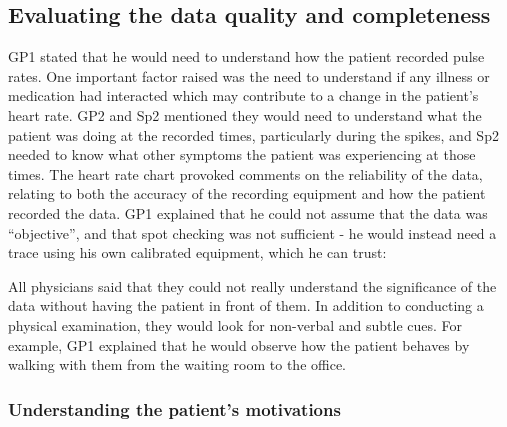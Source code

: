 \documentclass{sigchi}
\begin{document}

\subsection{Evaluating the data quality and completeness}

GP1 stated that he would need to understand how the patient recorded pulse rates. One important factor raised was the need to understand if any illness or medication had interacted which may contribute to a change in the patient's heart rate. GP2 and Sp2 mentioned they would need to understand what the patient was doing at the recorded times, particularly during the spikes, and Sp2 needed to know what other symptoms the patient was experiencing at those times. The heart rate chart provoked comments on the reliability of the data, relating to both the accuracy of the recording equipment and how the patient recorded the data. GP1 explained that he could not assume that the data was ``objective'', and that spot checking was not sufficient - he would instead need a trace using his own calibrated equipment, which he can trust:


All physicians said that they could not really understand the significance of the data without having the patient in front of them.  In addition to conducting a physical examination, they would look for non-verbal and subtle cues.  For example, GP1 explained that he would observe how the patient behaves by walking with them from the waiting room to the office. 



\subsubsection{Understanding the patient's motivations}
\end{document}
